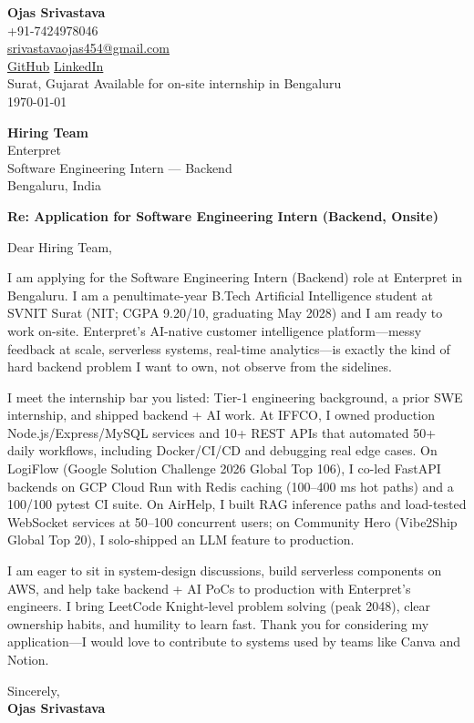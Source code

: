 \documentclass[a4paper,11pt]{article}
\begin{document}
\begin{flushright}
\textbf{Ojas Srivastava} \\
+91-7424978046 \\
\href{mailto:srivastavaojas454@gmail.com}{srivastavaojas454@gmail.com} \\
\href{https://github.com/Ojas-Srivastava05}{GitHub} \textbar{}
\href{https://linkedin.com/in/ojas-srivastava05}{LinkedIn} \\
Surat, Gujarat \textbar{} Available for on-site internship in Bengaluru \\
\today
\end{flushright}

\vspace{4mm}
\textbf{Hiring Team} \\
Enterpret \\
Software Engineering Intern --- Backend \\
Bengaluru, India

\vspace{2mm}
\textbf{Re: Application for Software Engineering Intern (Backend, Onsite)}

Dear Hiring Team,

I am applying for the Software Engineering Intern (Backend) role at Enterpret in Bengaluru. I am a penultimate-year B.Tech Artificial Intelligence student at SVNIT Surat (NIT; CGPA 9.20/10, graduating May 2028) and I am ready to work on-site. Enterpret's AI-native customer intelligence platform---messy feedback at scale, serverless systems, real-time analytics---is exactly the kind of hard backend problem I want to own, not observe from the sidelines.

I meet the internship bar you listed: Tier-1 engineering background, a prior SWE internship, and shipped backend + AI work. At IFFCO, I owned production Node.js/Express/MySQL services and 10+ REST APIs that automated 50+ daily workflows, including Docker/CI/CD and debugging real edge cases. On LogiFlow (Google Solution Challenge 2026 Global Top 106), I co-led FastAPI backends on GCP Cloud Run with Redis caching (100--400 ms hot paths) and a 100/100 pytest CI suite. On AirHelp, I built RAG inference paths and load-tested WebSocket services at 50--100 concurrent users; on Community Hero (Vibe2Ship Global Top 20), I solo-shipped an LLM feature to production.

I am eager to sit in system-design discussions, build serverless components on AWS, and help take backend + AI PoCs to production with Enterpret's engineers. I bring LeetCode Knight-level problem solving (peak 2048), clear ownership habits, and humility to learn fast. Thank you for considering my application---I would love to contribute to systems used by teams like Canva and Notion.

Sincerely, \\
\vspace{8mm}
\textbf{Ojas Srivastava}
\end{document}
